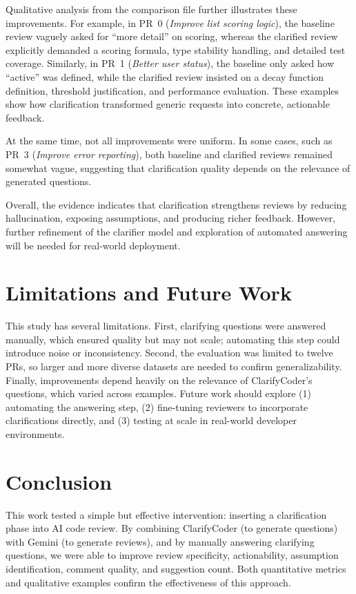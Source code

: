 \documentclass[conference]{IEEEtran}
\begin{document}
Qualitative analysis from the comparison file further illustrates these improvements. For example, in PR~0 (\emph{Improve list scoring logic}), the baseline review vaguely asked for “more detail” on scoring, whereas the clarified review explicitly demanded a scoring formula, type stability handling, and detailed test coverage. Similarly, in PR~1 (\emph{Better user status}), the baseline only asked how “active” was defined, while the clarified review insisted on a decay function definition, threshold justification, and performance evaluation. These examples show how clarification transformed generic requests into concrete, actionable feedback.

At the same time, not all improvements were uniform. In some cases, such as PR~3 (\emph{Improve error reporting}), both baseline and clarified reviews remained somewhat vague, suggesting that clarification quality depends on the relevance of generated questions.

Overall, the evidence indicates that clarification strengthens reviews by reducing hallucination, exposing assumptions, and producing richer feedback. However, further refinement of the clarifier model and exploration of automated answering will be needed for real-world deployment.

\section{Limitations and Future Work}
This study has several limitations. First, clarifying questions were answered manually, which ensured quality but may not scale; automating this step could introduce noise or inconsistency. Second, the evaluation was limited to twelve PRs, so larger and more diverse datasets are needed to confirm generalizability. Finally, improvements depend heavily on the relevance of ClarifyCoder’s questions, which varied across examples.  
Future work should explore (1) automating the answering step, (2) fine-tuning reviewers to incorporate clarifications directly, and (3) testing at scale in real-world developer environments.

\section{Conclusion}
This work tested a simple but effective intervention: inserting a clarification phase into AI code review. By combining ClarifyCoder (to generate questions) with Gemini (to generate reviews), and by manually answering clarifying questions, we were able to improve review specificity, actionability, assumption identification, comment quality, and suggestion count. Both quantitative metrics and qualitative examples confirm the effectiveness of this approach.
\end{document}
